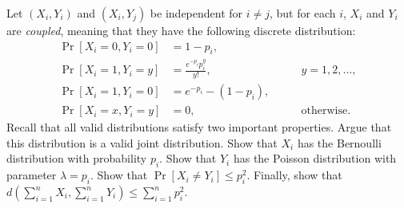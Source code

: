 \documentclass[11pt]{article}
\begin{document}
\begin{Parts}
    \setcounter{enumi}{2}
    \Part Let $(X_i, Y_i)$ and $(X_i, Y_j)$ be independent for $i \ne j$, but for each $i$, $X_i$ and $Y_i$ are \textit{coupled}, meaning that they have the following discrete distribution:
    \begin{align*}
        \Pr[X_i=0, Y_i=0] &= 1-p_i, & \\
        \Pr[X_i=1, Y_i=y] &= \frac{e^{-p_i} p_i^y}{y!}, &\qquad y = 1, 2, \dotsc, \\
        \Pr[X_i=1, Y_i=0] &= e^{-p_i} - (1-p_i), & \\
        \Pr[X_i=x, Y_i=y] &= 0, & \qquad \text{otherwise}.
    \end{align*}
    Recall that all valid distributions satisfy two important properties.
    Argue that this distribution is a valid joint distribution.
    \Part Show that $X_i$ has the Bernoulli distribution with probability $p_i$.
    \Part Show that $Y_i$ has the Poisson distribution with parameter $\lambda = p_i$.
    \Part Show that $\Pr[X_i \neq Y_i] \leq p_i^2$.
    \Part Finally, show that $d(\sum_{i=1}^n X_i, \sum_{i=1}^n Y_i) \leq \sum_{i=1}^n p_i^2$.
\end{Parts}
\end{document}
